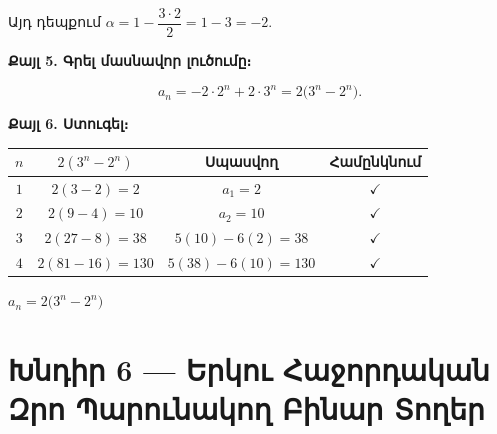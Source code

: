 \documentclass[12pt, a4paper]{article}
\begin{document}
Այդ դեպքում $\alpha = 1 - \dfrac{3 \cdot 2}{2} = 1 - 3 = -2$.

\textbf{Քայլ 5. Գրել մասնավոր լուծումը։}

\[
  a_n = -2 \cdot 2^n + 2 \cdot 3^n = \boxed{2\bigl(3^n - 2^n\bigr)}.
\]

\textbf{Քայլ 6. Ստուգել։}

\begin{center}
\renewcommand{\arraystretch}{1.3}
\begin{tabular}{cccc}
\toprule
$n$ & $2(3^n - 2^n)$ & Սպասվող & Համընկնում \\
\midrule
$1$ & $2(3 - 2) = 2$ & $a_1 = 2$ & $\checkmark$ \\
$2$ & $2(9 - 4) = 10$ & $a_2 = 10$ & $\checkmark$ \\
$3$ & $2(27 - 8) = 38$ & $5(10) - 6(2) = 38$ & $\checkmark$ \\
$4$ & $2(81 - 16) = 130$ & $5(38) - 6(10) = 130$ & $\checkmark$ \\
\bottomrule
\end{tabular}
\end{center}

\begin{answerbox}
\centering
$a_n = 2\bigl(3^n - 2^n\bigr)$
\end{answerbox}

\newpage
\section{Խնդիր 6 — Երկու Հաջորդական Զրո Պարունակող Բինար Տողեր}
\end{document}
